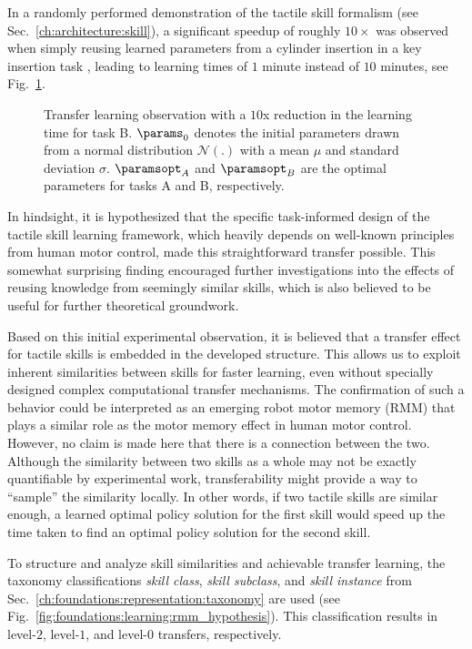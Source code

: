 In a randomly performed demonstration of the tactile skill formalism \skillmodelabbr{} (see Sec.~\ref{ch:architecture:skill}), a significant speedup of roughly $10 \times$ was observed when simply reusing learned parameters from a cylinder insertion in a key insertion task \cite{Haddadin.2018}, leading to learning times of $1$ minute instead of $10$ minutes, see Fig.~\ref{fig:foundations:learning:rmm_pre_exp}.

\begin{figure}
    \centering
    
    \caption{Transfer learning observation with a $10$x reduction in the learning time for task B. $\params_0$ denotes the initial parameters drawn from a normal distribution $\mathcal{N}(.)$ with a mean $\mu$ and standard deviation $\sigma$. $\paramsopt_A$ and $\paramsopt_B$ are the optimal parameters for tasks A and B, respectively.}
    \label{fig:foundations:learning:rmm_pre_exp}
\end{figure}

In hindsight, it is hypothesized that the specific task-informed design of the tactile skill learning framework, which heavily depends on well-known principles from human motor control, made this straightforward transfer possible.
This somewhat surprising finding encouraged further investigations into the effects of reusing knowledge from seemingly similar skills, which is also believed to be useful for further theoretical groundwork.

Based on this initial experimental observation, it is believed that a transfer effect for tactile skills is embedded in the developed structure.
This allows us to exploit inherent similarities between skills for faster learning, even without specially designed complex computational transfer mechanisms.
The confirmation of such a behavior could be interpreted as an emerging robot motor memory (RMM) that plays a similar role as the motor memory effect in human motor control.
However, no claim is made here that there is a connection between the two.
Although the similarity between two skills as a whole may not be exactly quantifiable by experimental work, transferability might provide a way to ``sample'' the similarity locally.
In other words, if two tactile skills are similar enough, a learned optimal policy solution for the first skill would speed up the time taken to find an optimal policy solution for the second skill.

To structure and analyze skill similarities and achievable transfer learning, the taxonomy classifications \emph{skill class}, \emph{skill subclass}, and \emph{skill instance} from Sec.~\ref{ch:foundations:representation:taxonomy} are used (see Fig.~\ref{fig:foundations:learning:rmm_hypothesis}).
This classification results in level-$2$, level-$1$, and level-$0$ transfers, respectively.

